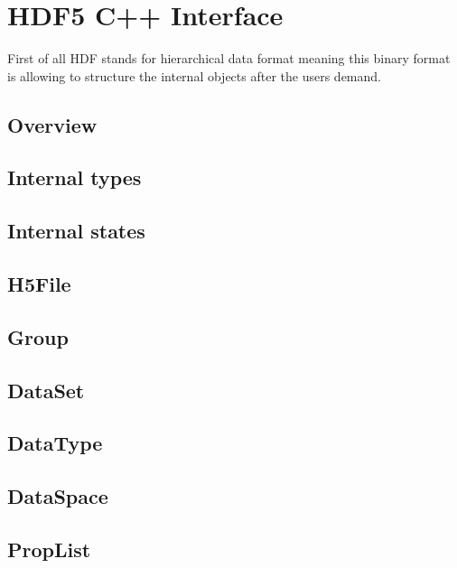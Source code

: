 \chapter{HDF5 C++ Interface}
First of all HDF stands for hierarchical data format meaning this binary format is allowing to structure the internal objects after the users demand.
\section{Overview}
\section{Internal types}
\section{Internal states}
\section{H5File}
\section{Group}
\section{DataSet}
\section{DataType}
\section{DataSpace}
\section{PropList}
